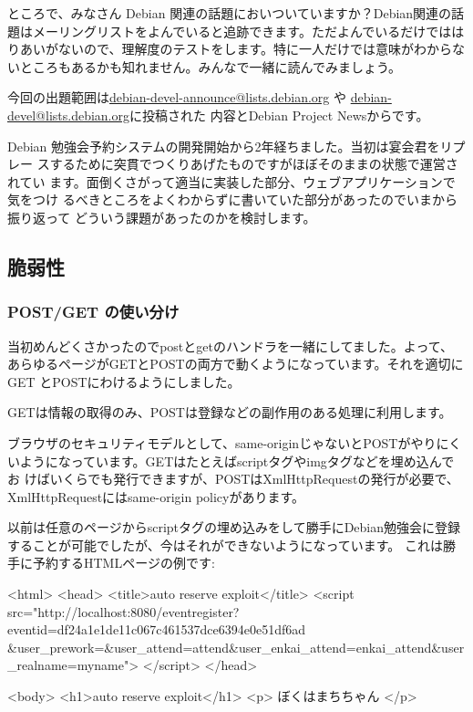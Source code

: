 \documentclass[mingoth,a4paper]{jsarticle}
\begin{document}

ところで、みなさん Debian 関連の話題においついていますか？Debian関連の話
題はメーリングリストをよんでいると追跡できます。ただよんでいるだけではは
りあいがないので、理解度のテストをします。特に一人だけでは意味がわからな
いところもあるかも知れません。みんなで一緒に読んでみましょう。

今回の出題範囲は\url{debian-devel-announce@lists.debian.org} や \url{debian-devel@lists.debian.org}に投稿された
内容とDebian Project Newsからです。

\begin{multicols}{2}
 
\end{multicols}


Debian 勉強会予約システムの開発開始から2年経ちました。当初は宴会君をリプレー
スするために突貫でつくりあげたものですがほぼそのままの状態で運営されてい
ます。面倒くさがって適当に実装した部分、ウェブアプリケーションで気をつけ
るべきところをよくわからずに書いていた部分があったのでいまから振り返って
どういう課題があったのかを検討します。

\subsection{脆弱性}

\subsubsection{POST/GET の使い分け}

当初めんどくさかったのでpostとgetのハンドラを一緒にしてました。よって、
あらゆるページがGETとPOSTの両方で動くようになっています。それを適切にGET
とPOSTにわけるようにしました。

GETは情報の取得のみ、POSTは登録などの副作用のある処理に利用します。

ブラウザのセキュリティモデルとして、same-originじゃないとPOSTがやりにく
いようになっています。GETはたとえばscriptタグやimgタグなどを埋め込んでお
けばいくらでも発行できますが、POSTはXmlHttpRequestの発行が必要で、
XmlHttpRequestにはsame-origin policyがあります。

以前は任意のページからscriptタグの埋め込みをして勝手にDebian勉強会に登録
することが可能でしたが、今はそれができないようになっています。
これは勝手に予約するHTMLページの例です:
\begin{commandline}
<html>
  <head>
    <title>auto reserve exploit</title>
    <script
 src="http://localhost:8080/eventregister?eventid=df24a1e1de11c067c461537dce6394e0e51df6ad
&user_prework=&user_attend=attend&user_enkai_attend=enkai_attend&user_realname=myname">
    </script>
  </head>

  <body>
    <h1>auto reserve exploit</h1>
    <p>
      ぼくはまちちゃん
    </p>
\end{commandline}
\end{document}
